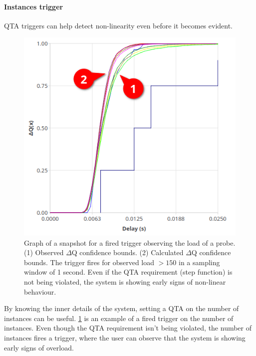         \paragraph{Instances trigger}

        QTA triggers can help detect non-linearity even before it becomes evident. \\
        
        \begin{figure}[H]
            \begin{center}
                \includegraphics[scale=0.5]{img/overload_2/fired_samplea.png}
            \end{center}
            \caption{Graph of a snapshot for a fired trigger observing the load of a probe. (1) Observed $\Delta$Q confidence bounds. (2) Calculated $\Delta$Q confidence bounds. The trigger fires for observed load $> 150$ in a sampling window of 1 second. Even if the QTA requirement (step function) is not being violated, the system is showing early signs of non-linear behaviour.}%
            \label{fig:qta_trig}%
        \end{figure}
  
        By knowing the inner details of the system, setting a QTA on the number of instances can be useful. \cref{fig:qta_trig} is an example of a fired trigger on the number of instances. Even though the QTA requirement isn't being violated, the number of instances fires a trigger, where the user can observe that the system is showing early signs of overload.


